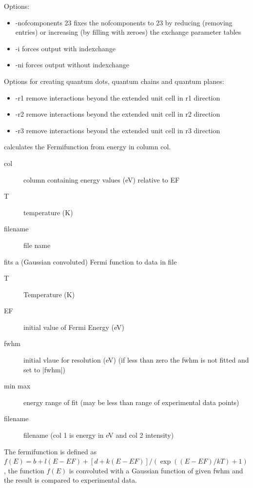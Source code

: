 \begin{description}
Options:
\begin{itemize}
 \item -nofcomponents 23 fixes the nofcomponents to 23 by 
                         reducing (removing entries) or increasing (by filling with zeroes) 
                         the exchange parameter tables
  \item -i  forces output with indexchange 
  \item -ni  forces output without indexchange 
\end{itemize}
 Options for creating quantum dots, quantum chains and quantum planes: 
\begin{itemize}
  \item -r1    remove interactions beyond the extended unit cell in r1 direction
  \item -r2    remove interactions beyond the extended unit cell in r2 direction
  \item -r3    remove interactions beyond the extended unit cell in r3 direction
\end{itemize}
\item [\prg fermicol\index{fermicol}\label{fermicol} col T filename] calculates the Fermifunction from energy in column col.
\begin{description}
\item[col] column containing energy values (eV) relative to EF
 \item[T] temperature (K)
 \item[filename] file name
\end{description}
\item[\prg fitfermi\index{fitfermi}\label{fitfermi} T EF fwhm min max filename] 
fits a (Gaussian convoluted) Fermi function to data in file
\begin{description}
\item[T] Temperature (K)
\item[EF] initial value of Fermi Energy (eV)
\item[fwhm] initial vlaue for resolution (eV) (if less than zero the fwhm is not fitted and set to |fwhm|)
\item[min max] energy range of fit (may be less than range of experimental data points)
\item[filename] filename (col 1 is energy in eV and col 2 intensity)
\end{description}
The fermifunction is defined as
      $ f(E)=b+l(E-EF)+[d+k(E-EF)]/(\exp((E-EF)/kT)+1)$, the function
      $ f(E)$ is convoluted with a Gaussian function of given fwhm
            and the  result is compared to experimental data.


\end{description}
